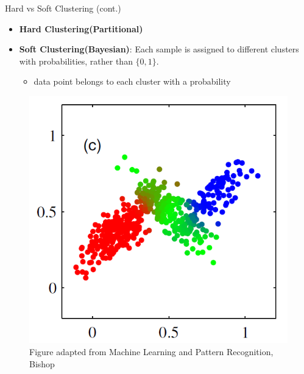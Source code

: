 \documentclass[serif, aspectratio=169]{beamer}
\begin{document}
\begin{frame}{Hard vs Soft Clustering (cont.)}
    \begin{minipage}{0.55\textwidth}
        \begin{itemize}
        \item \textbf{Hard Clustering(Partitional)}
        \item \textbf{Soft Clustering(Bayesian)}: Each sample is assigned to different clusters with probabilities, rather than $\{0,1\}$.
        \begin{itemize}
            \item data point belongs to each cluster with a probability
        \end{itemize}
        
    \end{itemize}
    \end{minipage}%
    \begin{minipage}{0.40\textwidth}
        \begin{figure}
            \centering
            \includegraphics[scale=0.5]{pic/soft_clustering.png}
            {\scriptsize Figure adapted from Machine Learning and Pattern Recognition, Bishop}
        \end{figure}
        
    \end{minipage}
    
\end{frame}
\end{document}
